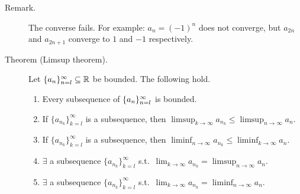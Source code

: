 \documentclass[letterpaper,11pt]{article}
\begin{document}
\begin{description}
\item[Remark.] The converse fails. For example: $a_n=(-1)^n$ does not converge,
    but $a_{2n}$ and $a_{2n+1}$ converge to $1$ and $-1$ respectively.


\item[Theorem (Limsup theorem).] Let $\{a_n\}_{n=l}^\infty\subseteq\mathbb{R}$ be bounded.
    The following hold.
    \begin{enumerate}[1)]
    \item Every subsequence of $\{a_n\}_{n=l}^\infty$ is bounded.
    \item If $\{a_{n_k}\}_{k=l}^\infty$ is a subsequence, then
        $\limsup_{k\to\infty}a_{n_k}\le\limsup_{n\to\infty}a_n$.
    \item If $\{a_{n_k}\}_{k=l}^\infty$ is a subsequence, then
        $\liminf_{n\to\infty}a_{n_k}\le\liminf_{k\to\infty}a_n$.
    \item $\exists$ a subsequence $\{a_{n_k}\}_{k=l}^\infty$ s.t.\
        $\lim_{k\to\infty}a_{n_k}=\limsup_{n\to\infty}a_n$.
    \item $\exists$ a subsequence $\{a_{n_k}\}_{k=l}^\infty$ s.t.\
        $\lim_{k\to\infty}a_{n_k}=\liminf_{n\to\infty}a_n$.
    \end{enumerate}


\end{description}
\end{document}
